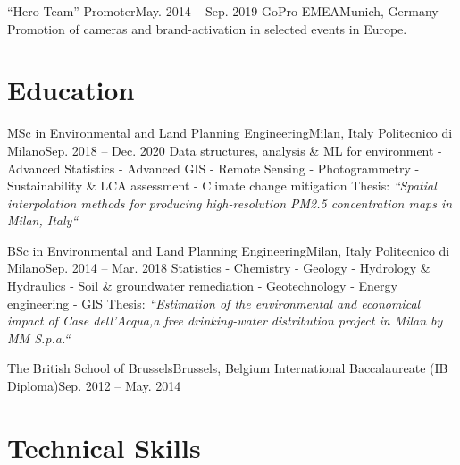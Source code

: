 \documentclass[letterpaper,11pt]{article}
\begin{document}
\sectionElement
{“Hero Team” Promoter}{May. 2014 -- Sep. 2019}
{GoPro EMEA}{Munich, Germany}
{Promotion of cameras and brand-activation in selected events in Europe.}

\sectionElementListEnd


\section{Education}
\sectionElementListStart

\sectionElement
{MSc in Environmental and Land Planning Engineering}{Milan, Italy}
{Politecnico di Milano}{Sep. 2018 -- Dec. 2020}
{\scriptsize Data structures, analysis \& ML for environment - Advanced Statistics - Advanced GIS -
  Remote Sensing - Photogrammetry -
  Sustainability \& LCA assessment - Climate change mitigation\newline
  {\scriptsize Thesis: \it “Spatial interpolation methods for producing high-resolution PM2.5 concentration maps in Milan, Italy“}}

\sectionElement
{BSc in Environmental and Land Planning Engineering}{Milan, Italy}
{Politecnico di Milano}{Sep. 2014 -- Mar. 2018}
{\scriptsize Statistics - Chemistry - Geology - Hydrology \& Hydraulics
  - Soil \& groundwater remediation - Geotechnology - Energy engineering - GIS\newline
  {\scriptsize Thesis: \it “Estimation of the environmental and economical impact of Case dell'Acqua,a free drinking-water distribution project in Milan by MM S.p.a.“}}

\sectionElement
{The British School of Brussels}{Brussels, Belgium}
{International Baccalaureate (IB Diploma)}{Sep. 2012 -- May. 2014}{}
\sectionElementListEnd

\section{Technical Skills}
\skillsListStart
{}
\skillsListEnd
\end{document}

